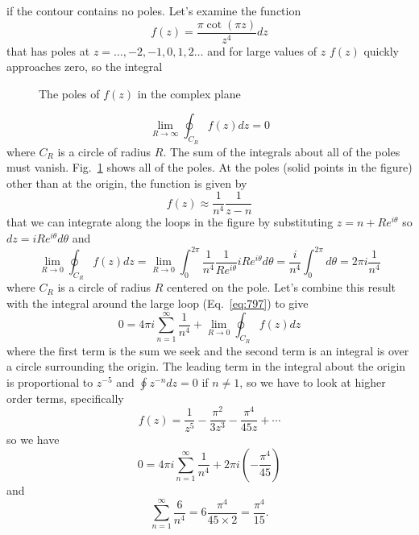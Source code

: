 if the contour contains no poles.  Let's examine the function
\begin{equation}
f(z) = \frac{\pi \cot (\pi z)}{z^4} dz
\label{eq:795}
\end{equation}
that has poles at $z= \ldots, -2, -1, 0, 1, 2 \ldots$ and for large
values of $z$ $f(z)$ quickly approaches zero, so the integral 
\begin{figure}
\begin{center}
\end{center}
\caption{The poles of $f(z)$ in the complex plane}
\label{fig:polesfz}
\end{figure}
\begin{equation}
\lim_{R\rightarrow \infty }\oint_{C_R} f(z) dz = 0
\label{eq:797}
\end{equation}
where $C_R$ is a circle of radius $R$.  The sum of the integrals about
all of the poles must vanish.  Fig.~\ref{fig:polesfz} shows all of the
poles.  At the poles (solid points in the figure) other than at the
origin, the function is given by
\begin{equation}
f(z) \approx \frac{1}{n^4} \frac{1}{z-n}
\label{eq:798}
\end{equation}
that we can integrate along the loops in the figure by substituting
$z=n+R e^{i\theta}$ so $dz = i R e^{i\theta} d\theta$ and
\begin{equation}
\lim_{R\rightarrow 0} \oint_{C_R} f(z) dz = 
\lim_{R\rightarrow 0} \int_0^{2\pi} \frac{1}{n^4} \frac{1}{R e^{i\theta}} i R
e^{i\theta} d\theta = \frac{i}{n^4} \int_0^{2\pi} d\theta = 2\pi i \frac{1}{n^4}
\label{eq:829}
\end{equation}
where $C_R$ is a circle of radius $R$ centered on the pole.   Let's
combine this result with the integral around the large loop
(Eq.~\ref{eq:797}) to give
\begin{equation}
0 = 4\pi i \sum_{n=1}^\infty \frac{1}{n^4} + \lim_{R\rightarrow 0}
\oint_{C_R} f(z) dz
\label{eq:799}
\end{equation}
where the first term is the sum we seek and the second term is an
integral is over a circle surrounding the origin.  The leading term in
the integral about the origin is proportional to $z^{-5}$ and $\oint
z^{-n} dz=0$ if $n\neq 1$, so we have to look at higher order terms,
specifically
\begin{equation}
f(z) = \frac{1}{z^5} - \frac{\pi^2}{3 z^3} - \frac{\pi^4}{45 z} +
\cdots 
\label{eq:803}
\end{equation}
so we have
\begin{equation}
0 = 4\pi i \sum_{n=1}^\infty \frac{1}{n^4} + 2\pi i \left ( -
  \frac{\pi^4}{45} \right )
\label{eq:802}
\end{equation}
and 
\begin{equation}
 \sum_{n=1}^\infty \frac{6}{n^4} = 6 \frac{\pi^4}{45\times 2} = \frac{\pi^4}{15}.
\end{equation}

